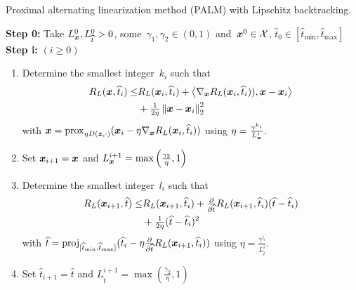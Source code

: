 \documentclass[nohyperref]{article}
\newcommand{\X}{\mathcal{X}}
\newcommand{\norm}[1]{\left\Vert#1\right\Vert}
\newcommand{\scal}[2]{\left\langle#1,#2\right\rangle}
\newcommand{\prox}{\mathrm{prox}}
\newcommand{\proj}{\mathrm{proj}}
\def\hatt{{\widehat{t}}}
\newcommand{\tminh}{\hatt_\mathrm{min}}
\newcommand{\tmaxh}{\hatt_\mathrm{max}}
\theoremstyle{plain}
\theoremstyle{definition}
\theoremstyle{remark}
\begin{document}
\begin{algorithm}[t]
\caption{Proximal alternating linearization method (PALM) with Lipschitz backtracking.}\label{alg:jointMinimization}
\textbf{Step 0:} Take $L_\vx^0,L_\hatt^0>0$, some~$\gamma_1,\gamma_2\in(0,1)$ and~$\vx^0\in\X$, $\hatt_0\in[\tminh,\tmaxh]$\\
\textbf{Step i:} $(i\geq 0)$ 
\begin{enumerate}
\item
Determine the smallest integer~$k_i$ such that 
\begin{align*}
R_L(\vx,\hatt_i) \leq &R_L(\vx_i,\hatt_i) + \scal{\nabla_\vx R_L(\vx_i,\hatt_i))}{\vx-\vx_i} \\
&+ \tfrac{1}{2\eta}\norm{\vx-\vx_i}_2^2
\end{align*}
with $\vx = \prox_{\eta D(\vz,\cdot)}(\vx_i-\eta\nabla_\vx R_L(\vx_i,\hatt_i))$ using $\eta=\tfrac{\gamma^{k_i}}{L_{\bm{x}}^i}$.
\item
Set ${\bm{x}}_{i+1}={\bm{x}}$ and $L_{\bm{x}}^{i+1}=\max\left(\tfrac{\gamma_2}{\eta},1\right)$
\item
Determine the smallest integer~$l_i$ such that 
\begin{align*}
R_L(\vx_{i+1},\hatt) \leq &R_L(\vx_{i+1},\hatt_i) + \tfrac{\partial}{\partial\hatt} R_L(\vx_{i+1},\hatt_i)(\hatt-\hatt_i) \\
&+ \tfrac{1}{2\eta}(\hatt-\hatt_i)^2
\end{align*}
with $\hatt = \proj_{[\tminh,\tmaxh]}(\hatt_i-\eta\tfrac{\partial}{\partial\hatt}R_L(\vx_{i+1},\hatt_i))$ using $\eta=\tfrac{\gamma^{l_i}}{L_\hatt^i}$.
\item
Set $\hatt_{i+1}=\hatt$ and $L_\hatt^{i+1}=\max\left(\tfrac{\gamma_2}{\eta},1\right)$
\end{enumerate}
\end{algorithm}
\end{document}
